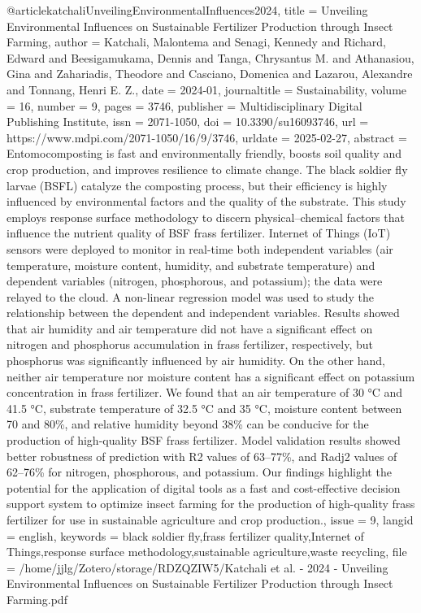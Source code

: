 {{{{@article{katchaliUnveilingEnvironmentalInfluences2024,
  title = {Unveiling {{Environmental Influences}} on {{Sustainable Fertilizer Production}} through {{Insect Farming}}},
  author = {Katchali, Malontema and Senagi, Kennedy and Richard, Edward and Beesigamukama, Dennis and Tanga, Chrysantus M. and Athanasiou, Gina and Zahariadis, Theodore and Casciano, Domenica and Lazarou, Alexandre and Tonnang, Henri E. Z.},
  date = {2024-01},
  journaltitle = {Sustainability},
  volume = {16},
  number = {9},
  pages = {3746},
  publisher = {Multidisciplinary Digital Publishing Institute},
  issn = {2071-1050},
  doi = {10.3390/su16093746},
  url = {https://www.mdpi.com/2071-1050/16/9/3746},
  urldate = {2025-02-27},
  abstract = {Entomocomposting is fast and environmentally friendly, boosts soil quality and crop production, and improves resilience to climate change. The black soldier fly larvae (BSFL) catalyze the composting process, but their efficiency is highly influenced by environmental factors and the quality of the substrate. This study employs response surface methodology to discern physical–chemical factors that influence the nutrient quality of BSF frass fertilizer. Internet of Things (IoT) sensors were deployed to monitor in real-time both independent variables (air temperature, moisture content, humidity, and substrate temperature) and dependent variables (nitrogen, phosphorous, and potassium); the data were relayed to the cloud. A non-linear regression model was used to study the relationship between the dependent and independent variables. Results showed that air humidity and air temperature did not have a significant effect on nitrogen and phosphorus accumulation in frass fertilizer, respectively, but phosphorus was significantly influenced by air humidity. On the other hand, neither air temperature nor moisture content has a significant effect on potassium concentration in frass fertilizer. We found that an air temperature of 30 °C and 41.5 °C, substrate temperature of 32.5 °C and 35 °C, moisture content between 70 and 80\%, and relative humidity beyond 38\% can be conducive for the production of high-quality BSF frass fertilizer. Model validation results showed better robustness of prediction with R2 values of 63–77\%, and Radj2 values of 62–76\% for nitrogen, phosphorous, and potassium. Our findings highlight the potential for the application of digital tools as a fast and cost-effective decision support system to optimize insect farming for the production of high-quality frass fertilizer for use in sustainable agriculture and crop production.},
  issue = {9},
  langid = {english},
  keywords = {black soldier fly,frass fertilizer quality,Internet of Things,response surface methodology,sustainable agriculture,waste recycling},
  file = {/home/jjlg/Zotero/storage/RDZQZIW5/Katchali et al. - 2024 - Unveiling Environmental Influences on Sustainable Fertilizer Production through Insect Farming.pdf}
}

}}}}
